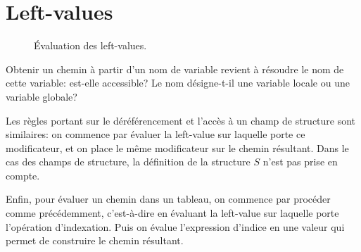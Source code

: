 \section{Left-values}
\label{sec:eval-lv}

\begin{figure}

  \centering


  \caption{Évaluation des left-values.}
\label{fig:eval-lv}
\end{figure}

Obtenir un chemin à partir d'un nom de variable revient à résoudre le nom de
cette variable: est-elle accessible? Le nom désigne-t-il une variable locale
ou une variable globale?

\begin{mathpar}
\end{mathpar}

Les règles portant sur le déréférencement et l'accès à un champ de structure
sont similaires: on commence par évaluer la left-value sur laquelle porte ce
modificateur, et on place le même modificateur sur le chemin résultant. Dans le
cas des champs de structure, la définition de la structure $S$ n'est pas prise
en compte.

\begin{mathpar}
\end{mathpar}

Enfin, pour évaluer un chemin dans un tableau, on commence par procéder comme
précédemment, c'est-à-dire en évaluant la left-value sur laquelle porte
l'opération d'indexation. Puis on évalue l'expression d'indice en une valeur qui
permet de construire le chemin résultant.

\begin{mathpar}
\end{mathpar}

